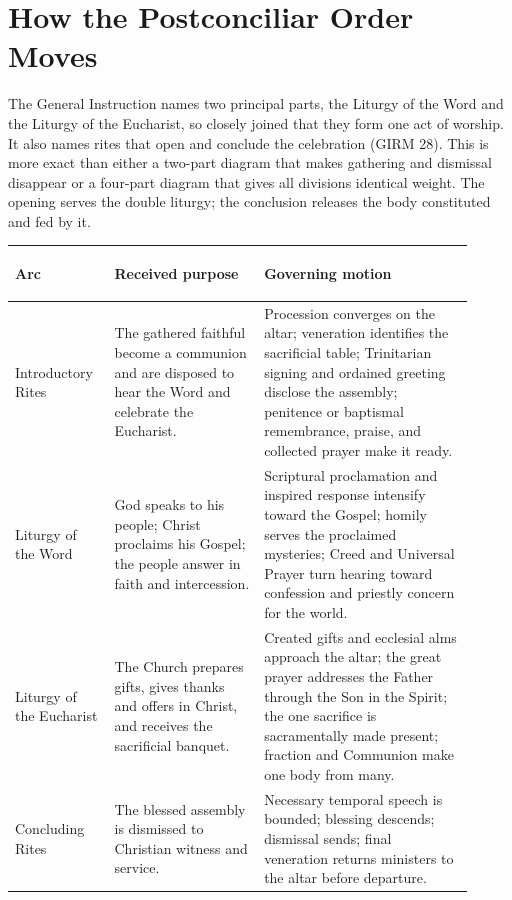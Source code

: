 \section{How the Postconciliar Order Moves}

The General Instruction names two principal parts, the Liturgy of the Word and the Liturgy of the Eucharist, so closely joined that they form one act of worship. It also names rites that open and conclude the celebration (GIRM 28). This is more exact than either a two-part diagram that makes gathering and dismissal disappear or a four-part diagram that gives all divisions identical weight. The opening serves the double liturgy; the conclusion releases the body constituted and fed by it.

\noindent\begin{tabular}{>{\bfseries\raggedright\arraybackslash}p{0.19\linewidth}>{\raggedright\arraybackslash}p{0.30\linewidth}>{\raggedright\arraybackslash}p{0.42\linewidth}}
\toprule
Arc & Received purpose & Governing motion\\
\midrule
Introductory Rites & The gathered faithful become a communion and are disposed to hear the Word and celebrate the Eucharist. & Procession converges on the altar; veneration identifies the sacrificial table; Trinitarian signing and ordained greeting disclose the assembly; penitence or baptismal remembrance, praise, and collected prayer make it ready.\\
Liturgy of the Word & God speaks to his people; Christ proclaims his Gospel; the people answer in faith and intercession. & Scriptural proclamation and inspired response intensify toward the Gospel; homily serves the proclaimed mysteries; Creed and Universal Prayer turn hearing toward confession and priestly concern for the world.\\
Liturgy of the Eucharist & The Church prepares gifts, gives thanks and offers in Christ, and receives the sacrificial banquet. & Created gifts and ecclesial alms approach the altar; the great prayer addresses the Father through the Son in the Spirit; the one sacrifice is sacramentally made present; fraction and Communion make one body from many.\\
Concluding Rites & The blessed assembly is dismissed to Christian witness and service. & Necessary temporal speech is bounded; blessing descends; dismissal sends; final veneration returns ministers to the altar before departure.\\
\bottomrule
\end{tabular}

